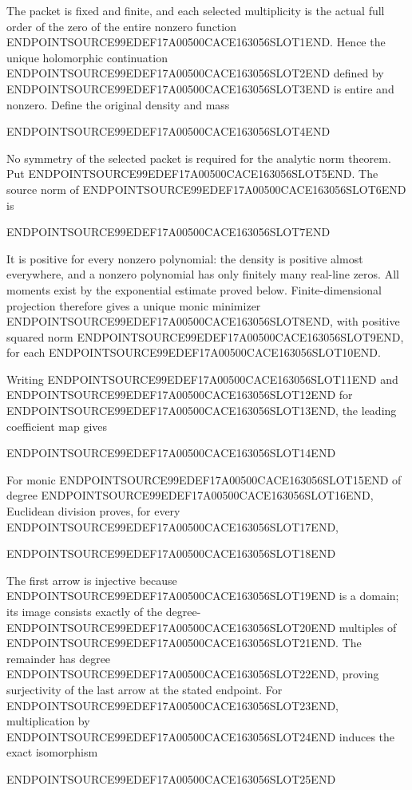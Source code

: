 The packet is fixed and finite, and each selected multiplicity is the actual full order of the zero of the entire nonzero function ENDPOINTSOURCE99EDEF17A00500CACE163056SLOT1END. Hence the unique holomorphic continuation ENDPOINTSOURCE99EDEF17A00500CACE163056SLOT2END defined by ENDPOINTSOURCE99EDEF17A00500CACE163056SLOT3END is entire and nonzero. Define the original density and mass

ENDPOINTSOURCE99EDEF17A00500CACE163056SLOT4END

No symmetry of the selected packet is required for the analytic norm theorem. Put ENDPOINTSOURCE99EDEF17A00500CACE163056SLOT5END. The source norm of ENDPOINTSOURCE99EDEF17A00500CACE163056SLOT6END is

ENDPOINTSOURCE99EDEF17A00500CACE163056SLOT7END

It is positive for every nonzero polynomial: the density is positive almost everywhere, and a nonzero polynomial has only finitely many real-line zeros. All moments exist by the exponential estimate proved below. Finite-dimensional projection therefore gives a unique monic minimizer ENDPOINTSOURCE99EDEF17A00500CACE163056SLOT8END, with positive squared norm ENDPOINTSOURCE99EDEF17A00500CACE163056SLOT9END, for each ENDPOINTSOURCE99EDEF17A00500CACE163056SLOT10END.

Writing ENDPOINTSOURCE99EDEF17A00500CACE163056SLOT11END and ENDPOINTSOURCE99EDEF17A00500CACE163056SLOT12END for ENDPOINTSOURCE99EDEF17A00500CACE163056SLOT13END, the leading coefficient map gives

ENDPOINTSOURCE99EDEF17A00500CACE163056SLOT14END

For monic ENDPOINTSOURCE99EDEF17A00500CACE163056SLOT15END of degree ENDPOINTSOURCE99EDEF17A00500CACE163056SLOT16END, Euclidean division proves, for every ENDPOINTSOURCE99EDEF17A00500CACE163056SLOT17END,

ENDPOINTSOURCE99EDEF17A00500CACE163056SLOT18END

The first arrow is injective because ENDPOINTSOURCE99EDEF17A00500CACE163056SLOT19END is a domain; its image consists exactly of the degree-ENDPOINTSOURCE99EDEF17A00500CACE163056SLOT20END multiples of ENDPOINTSOURCE99EDEF17A00500CACE163056SLOT21END. The remainder has degree ENDPOINTSOURCE99EDEF17A00500CACE163056SLOT22END, proving surjectivity of the last arrow at the stated endpoint. For ENDPOINTSOURCE99EDEF17A00500CACE163056SLOT23END, multiplication by ENDPOINTSOURCE99EDEF17A00500CACE163056SLOT24END induces the exact isomorphism

ENDPOINTSOURCE99EDEF17A00500CACE163056SLOT25END

